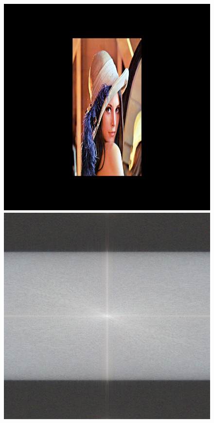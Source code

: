 \begin{figure}
{			{\includegraphics[scale=0.125]{decompoSzeliski_image2.png}}
			{\includegraphics[scale=0.125]{decompoSzeliski_fourier2.png}}
		}
\end{figure}

